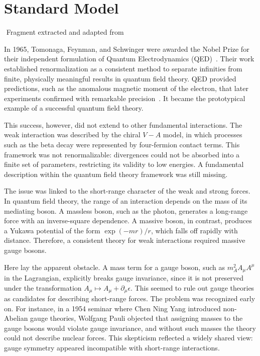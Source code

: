 \section{Standard Model}

{$ $ \scriptsize \hfill Fragment extracted and adapted from~\parencite{robinson2011symmetry}}

In 1965, Tomonaga, Feynman, and Schwinger were awarded the Nobel Prize for their independent formulation of Quantum Electrodynamics (QED)~\parencite{1972physics}. Their work established renormalization as a consistent method to separate infinities from finite, physically meaningful results in quantum field theory. QED provided predictions, such as the anomalous magnetic moment of the electron, that later experiments confirmed with remarkable precision~\parencite{1674-1137-40-10-100001, PhysRev.75.486}. It became the prototypical example of a successful quantum field theory.

This success, however, did not extend to other fundamental interactions. The weak interaction was described by the chiral $V-A$ model, in which processes such as the beta decay were represented by four-fermion contact terms. This framework was not renormalizable: divergences could not be absorbed into a finite set of parameters, restricting its validity to low energies. A fundamental description within the quantum field theory framework was still missing.

The issue was linked to the short-range character of the weak and strong forces. In quantum field theory, the range of an interaction depends on the mass of its mediating boson. A massless boson, such as the photon, generates a long-range force with an inverse-square dependence. A massive boson, in contrast, produces a Yukawa potential of the form $\exp(-mr)/r$, which falls off rapidly with distance. Therefore, a consistent theory for weak interactions required massive gauge bosons.

Here lay the apparent obstacle. A mass term for a gauge boson, such as $m_{A}^{2} A_{\mu} A^{\mu}$ in the Lagrangian, explicitly breaks gauge invariance, since it is not preserved under the transformation $A_{\mu} \mapsto A_{\mu} + \partial_{\mu}\epsilon$. This seemed to rule out gauge theories as candidates for describing short-range forces. The problem was recognized early on. For instance, in a 1954 seminar where Chen Ning Yang introduced non-Abelian gauge theories, Wolfgang Pauli objected that assigning masses to the gauge bosons would violate gauge invariance, and without such masses the theory could not describe nuclear forces. This skepticism reflected a widely shared view: gauge symmetry appeared incompatible with short-range interactions.

